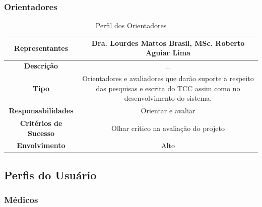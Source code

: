 \begin{anexosenv}
	\subsubsection{Orientadores}

	\begin{table}[]
		\centering
		\caption{Perfil dos Orientadores}
		\begin{tabular}{@{}|c|c|@{}}
			\toprule
			\textbf{Representantes}       & Dra. Lourdes Mattos Brasil, MSc. Roberto Aguiar Lima                                                                             \\ \midrule
			\textbf{Descrição}            & ...                                                                                                                              \\ \midrule
			\textbf{Tipo}                 & Orientadores e avaliadores que darão suporte a respeito das pesquisas e escrita do TCC assim como no desenvolvimento do sistema. \\ \midrule
			\textbf{Responsabilidades}    & Orientar e avaliar                                                                                                               \\ \midrule
			\textbf{Critérios de Sucesso} & Olhar crítico na avaliação do projeto                                                                                            \\ \midrule
			\textbf{Envolvimento}         & Alto                                                                                                                             \\ \bottomrule
		\end{tabular}
		\label{table:Perfil dos Orientadores}
	\end{table}

	\subsection{Perfis do Usuário}

	\subsubsection{Médicos}


\end{anexosenv}
